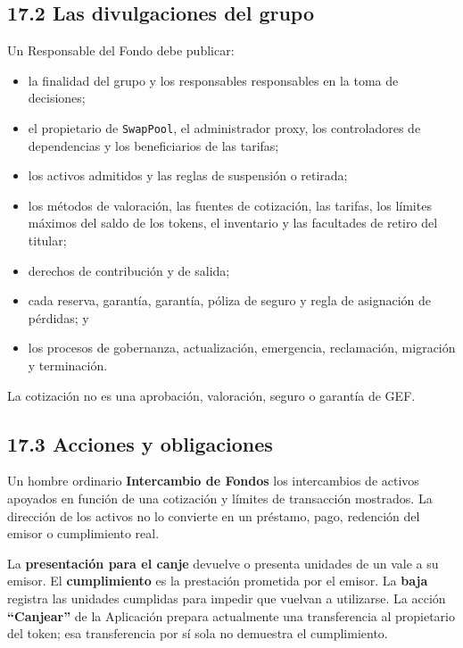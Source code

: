 \documentclass[11pt]{article}
\begin{document}
\subsection*{17.2 Las divulgaciones del grupo}

Un Responsable del Fondo debe publicar:

\begin{itemize}[leftmargin=*]
\item la finalidad del grupo y los responsables responsables en la toma de decisiones;
\item el propietario de \texttt{SwapPool}, el administrador proxy, los controladores de dependencias y los beneficiarios de las tarifas;
\item los activos admitidos y las reglas de suspensión o retirada;
\item los métodos de valoración, las fuentes de cotización, las tarifas, los límites máximos del saldo de los tokens, el inventario y las facultades de retiro del titular;
\item derechos de contribución y de salida;
\item cada reserva, garantía, garantía, póliza de seguro y regla de asignación de pérdidas; y
\item los procesos de gobernanza, actualización, emergencia, reclamación, migración y terminación.
\end{itemize}
La cotización no es una aprobación, valoración, seguro o garantía de GEF.

\subsection*{17.3 Acciones y obligaciones}

Un hombre ordinario \textbf{Intercambio de Fondos} los intercambios de activos apoyados en función de una cotización y límites de transacción mostrados. La dirección de los activos no lo convierte en un préstamo, pago, redención del emisor o cumplimiento real.

La \textbf{presentación para el canje} devuelve o presenta unidades de un vale a su emisor. El \textbf{cumplimiento} es la prestación prometida por el emisor. La \textbf{baja} registra las unidades cumplidas para impedir que vuelvan a utilizarse. La acción \textbf{``Canjear''} de la Aplicación prepara actualmente una transferencia al propietario del token; esa transferencia por sí sola no demuestra el cumplimiento.
\end{document}
